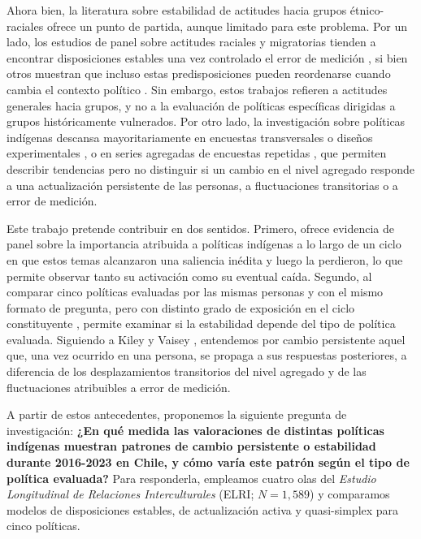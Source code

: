 \documentclass{article}
\begin{document}
Ahora bien, la literatura sobre estabilidad de actitudes hacia grupos étnico-raciales ofrece un punto de partida, aunque limitado para este problema. Por un lado, los estudios de panel sobre actitudes raciales y migratorias tienden a encontrar disposiciones estables una vez controlado el error de medición \parencite{kustov2021}, si bien otros muestran que incluso estas predisposiciones pueden reordenarse cuando cambia el contexto político \parencite{engelhardt2021}. Sin embargo, estos trabajos refieren a actitudes generales hacia grupos, y no a la evaluación de políticas específicas dirigidas a grupos históricamente vulnerados. Por otro lado, la investigación sobre políticas indígenas descansa mayoritariamente en encuestas transversales o diseños experimentales \parencite{alcantara2025,bergmann2024,foxworth2026,fuentes2025,pehrson2011}, o en series agregadas de encuestas repetidas \parencite{levy2022}, que permiten describir tendencias pero no distinguir si un cambio en el nivel agregado responde a una actualización persistente de las personas, a fluctuaciones transitorias o a error de medición.

Este trabajo pretende contribuir en dos sentidos. Primero, ofrece evidencia de panel sobre la importancia atribuida a políticas indígenas a lo largo de un ciclo en que estos temas alcanzaron una saliencia inédita y luego la perdieron, lo que permite observar tanto su activación como su eventual caída. Segundo, al comparar cinco políticas evaluadas por las mismas personas y con el mismo formato de pregunta, pero con distinto grado de exposición en el ciclo constituyente \parencite{disipavlic2024}, permite examinar si la estabilidad depende del tipo de política evaluada. Siguiendo a Kiley y Vaisey \parencite*{kiley2020}, entendemos por cambio persistente aquel que, una vez ocurrido en una persona, se propaga a sus respuestas posteriores, a diferencia de los desplazamientos transitorios del nivel agregado y de las fluctuaciones atribuibles a error de medición.

A partir de estos antecedentes, proponemos la siguiente pregunta de investigación: \textbf{¿En qué medida las valoraciones de distintas políticas indígenas muestran patrones de cambio persistente o estabilidad durante 2016-2023 en Chile, y cómo varía este patrón según el tipo de política evaluada?} Para responderla, empleamos cuatro olas del \textit{Estudio Longitudinal de Relaciones Interculturales} (ELRI; $N=1{,}589$) y comparamos modelos de disposiciones estables, de actualización activa y quasi-simplex para cinco políticas. 
\end{document}
